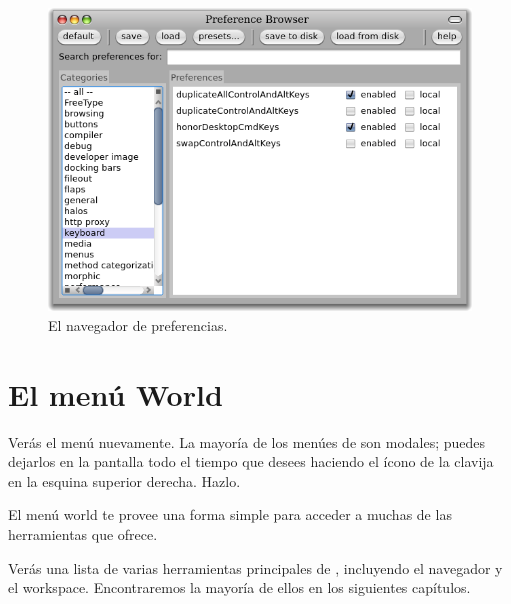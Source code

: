\documentclass[a4paper,10pt,twoside]{book}
\begin{document}
\begin{figure}[htb]
\centerline{\includegraphics[width=\textwidth]{PreferenceBrowser}}
\caption{El navegador de preferencias.}
\end{figure}


\section{El men\'u World}

Ver\'as el men\'u  nuevamente.
La mayor\'ia de los men\'ues de \pharo son modales; puedes dejarlos en la pantalla todo el tiempo que desees haciendo \click el \'icono de la clavija en la esquina superior derecha. Hazlo.

El men\'u world te provee una forma simple para acceder a muchas de las herramientas que \pharo ofrece.


Ver\'as una lista de varias herramientas principales de \pharo, incluyendo el navegador y el workspace.
Encontraremos la mayor\'ia de ellos en los siguientes cap\'itulos.

\end{document}
